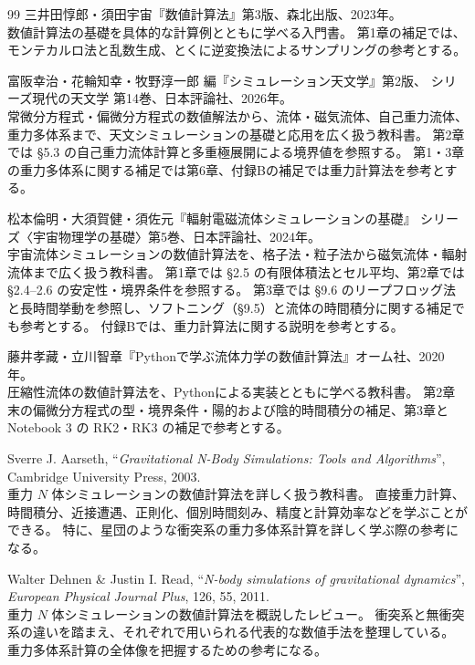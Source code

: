 \begin{thebibliography}{99}
三井田惇郎・須田宇宙『数値計算法』第3版、森北出版、2023年。\\
数値計算法の基礎を具体的な計算例とともに学べる入門書。
第1章の補足では、モンテカルロ法と乱数生成、とくに逆変換法によるサンプリングの参考とする。

富阪幸治・花輪知幸・牧野淳一郎 編『シミュレーション天文学』第2版、
シリーズ現代の天文学 第14巻、日本評論社、2026年。\\
常微分方程式・偏微分方程式の数値解法から、流体・磁気流体、自己重力流体、重力多体系まで、天文シミュレーションの基礎と応用を広く扱う教科書。
第2章では §5.3 の自己重力流体計算と多重極展開による境界値を参照する。
第1・3章の重力多体系に関する補足では第6章、付録Bの補足では重力計算法を参考とする。

松本倫明・大須賀健・須佐元『輻射電磁流体シミュレーションの基礎』
シリーズ〈宇宙物理学の基礎〉第5巻、日本評論社、2024年。\\
宇宙流体シミュレーションの数値計算法を、格子法・粒子法から磁気流体・輻射流体まで広く扱う教科書。
第1章では §2.5 の有限体積法とセル平均、第2章では §2.4--2.6 の安定性・境界条件を参照する。
第3章では §9.6 のリープフロッグ法と長時間挙動を参照し、ソフトニング（§9.5）と流体の時間積分に関する補足でも参考とする。
付録Bでは、重力計算法に関する説明を参考とする。

藤井孝藏・立川智章『Pythonで学ぶ流体力学の数値計算法』オーム社、2020年。\\
圧縮性流体の数値計算法を、Pythonによる実装とともに学べる教科書。
第2章末の偏微分方程式の型・境界条件・陽的および陰的時間積分の補足、第3章と Notebook 3 の RK2・RK3 の補足で参考とする。

Sverre J. Aarseth, ``\textit{Gravitational N-Body Simulations: Tools and Algorithms}'', Cambridge University Press, 2003.\\
重力 $N$ 体シミュレーションの数値計算法を詳しく扱う教科書。
直接重力計算、時間積分、近接遭遇、正則化、個別時間刻み、精度と計算効率などを学ぶことができる。
特に、星団のような衝突系の重力多体系計算を詳しく学ぶ際の参考になる。

Walter Dehnen \& Justin I. Read, ``\textit{N-body simulations of gravitational dynamics}'', \textit{European Physical Journal Plus}, 126, 55, 2011.\\
重力 $N$ 体シミュレーションの数値計算法を概説したレビュー。
衝突系と無衝突系の違いを踏まえ、それぞれで用いられる代表的な数値手法を整理している。
重力多体系計算の全体像を把握するための参考になる。

\end{thebibliography}
